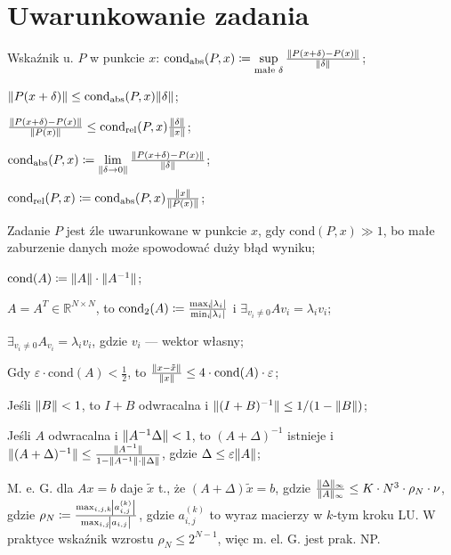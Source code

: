 \section{Uwarunkowanie zadania}

\entry
Wskaźnik u. $P$ w punkcie $x$:
$\mathrm{cond}_{\mathrm{abs}}(P,x) \coloneqq \sup\limits_{\text{małe }\delta} \frac{\|P(x+\delta) - P(x)\|}{\|\delta\|}$;

\entry
$\|P(x+\delta)\| \leq \mathrm{cond}_{\mathrm{abs}}(P,x)\|\delta\|$;

\entry
$\frac{\|P(x+\delta) - P(x)\|}{\|P(x)\|} \leq \mathrm{cond}_{\mathrm{rel}}(P,x)\frac{\|\delta\|}{\|x\|}$;


\entry
$\mathrm{cond}_{\mathrm{abs}}(P,x) \coloneqq \lim\limits_{\|\delta \to 0\|} \frac{\|P(x+\delta) - P(x)\|}{\|\delta\|}$;

\entry
$\mathrm{cond}_{\mathrm{rel}}(P,x) \coloneqq \mathrm{cond}_{\mathrm{abs}}(P,x)\frac{\|x\|}{\|P(x)\|} $;

\entry
Zadanie $P$ jest źle uwarunkowane w punkcie $x$,
gdy $\mathrm{cond}(P,x) \gg 1$,
bo małe zaburzenie danych może spowodować duży błąd wyniku;

\entry
$\mathrm{cond}(A) \coloneqq \norm{\vphantom{A^{-1}}A}\cdot\norm{A^{-1}}$;

\entry
$A=A^T\in\mathbb{R}^{N\times N}$,
to
$\mathrm{cond}_2(A)\coloneqq \frac{\max_i\abs{\lambda_i}}{\min_i\abs{\lambda_i}}$
i
$\exists_{v_i\neq 0} Av_i=\lambda_i v_i$;

\entry
$\exists_{v_i\neq 0} A_{v_i} = \lambda_i v_i$,
gdzie $v_i$ --- wektor własny;

\entry
Gdy
$\varepsilon\cdot\mathrm{cond}(A) < \frac{1}{2}$,
to $\frac{\|x - \tilde{x}\|}{\|x\|} \leq 4 \cdot \mathrm{cond}(A) \cdot \varepsilon$;

\entry
Jeśli $\|B\| < 1$,
to $I+B$ odwracalna i $\|(I+B)^{-1}\| \leq 1 / (1 - \|B\|)$;

\entry
Jeśli $A$ odwracalna i $\|A^{-1}\Delta\| < 1$,
to $(A+\Delta)^{-1}$ istnieje
i $\|(A+\Delta)^{-1}\| \leq \frac{\|A^{-1}\|}{1 - \|A^{-1}\| \cdot \|\vphantom{A^1}\Delta\|}$,
gdzie $\Delta \leq \varepsilon\|A\|$;

\entry
M. e. G. dla $Ax=b$ daje $\tilde{x}$ t., że
$(A+\Delta) \tilde{x} = b$,
gdzie $\frac{\|\Delta\|_\infty}{\|A\|_\infty} \leq K\cdot N^3 \cdot \rho_N \cdot \nu$,
gdzie $\rho_N \coloneqq \frac{\max_{i,j,k}\abs{a_{i,j}^{(k)}}}{\max_{i,j} \abs{a_{i,j}}}$,
gdzie $a^{(k)}_{i,j}$ to wyraz macierzy w $k$-tym kroku LU. W praktyce wskaźnik wzrostu $\rho_N\leq 2^{N-1}$, więc m. el. G. jest prak. NP.

